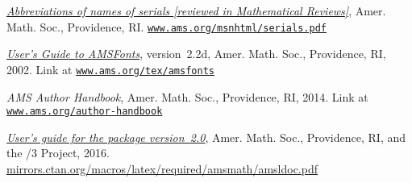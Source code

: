 
\renewcommand{\bibintro}{%
  Discounts are available on some of these books when they are ordered
  using information available on the \TeX\ Users Group page
  \href{https://www.tug.org/books/}{Books about TeX and Friends}.
  In particular, books published by Pearson affiliates (including
  Addison-Wesley) are eligible for a discount.}
  

\begin{thebibliography}{[ASMR]}

\raggedright


\href{http://www.ams.org/msnhtml/serials.pdf}
{\textit{Abbreviations of names of serials \textup[reviewed
in Mathematical Reviews\textup]}}, Amer. Math. Soc., Providence, RI.
\href{http://www.ams.org/msnhtml/serials.pdf}{\texttt{www.ams.org/msnhtml/serials.pdf}}


 \href{ftp://ftp.ams.org/pub/tex/doc/amsfonts/amsfndoc.pdf}
{\textit{User's Guide to AMSFonts}}, version~2.2d,
Amer. Math. Soc.,  Providence, RI, 2002.  Link at
\href{http://www.ams.org/tex/amsfonts}{\texttt{www.ams.org/tex/amsfonts}}

 \textit{AMS Author Handbook},
Amer. Math. Soc., Providence, RI, 2014.  Link at
\href{http://www.ams.org/author-handbook}{\texttt{www.ams.org/author-handbook}}

 \href{http://mirrors.ctan.org/macros/latex/required/amsmath/amsldoc.pdf}{\textit{User's guide for the  package
version~\textup{2.0}}}, Amer. Math. Soc., Providence, RI, and the \latex/3 Project, 2016.
\href{http://mirrors.ctan.org/macros/latex/required/amsmath/amsldoc.pdf}{\url{mirrors.ctan.org/macros/latex/required/amsmath/amsldoc.pdf}}


\end{thebibliography}
